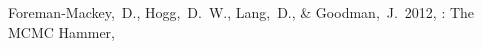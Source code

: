 \documentclass[12pt,twoside,pdftex]{article}
\begin{document}






\clearpage
{}\theendnotes

\clearpage
\begin{thebibliography}{}
  Foreman-Mackey,~D., Hogg,~D.~W., Lang,~D., \& Goodman,~J.\ 2012,
  : The MCMC Hammer,
\end{thebibliography}
\end{document}
